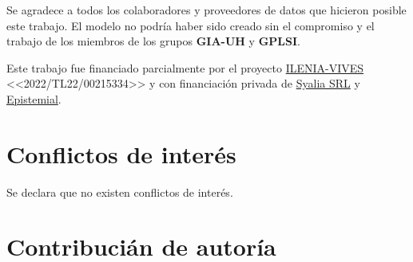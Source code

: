 \documentclass[10pt,twoside]{rcmart} %
\begin{document}
	Se agradece a todos los colaboradores y proveedores de datos que hicieron posible este trabajo. El modelo no podría haber sido creado sin el compromiso y el trabajo de los miembros de los grupos \textbf{GIA-UH} y \textbf{GPLSI}.

	Este trabajo fue financiado parcialmente por el proyecto \href{https://vives.gplsi.es/}{ILENIA-VIVES} <<2022/TL22/00215334>> y con financiación privada de \href{https://syalia.com/en/}{Syalia SRL} y \href{https://epistemial.com/}{Epistemial}.

\section*{Conflictos de interés}

	Se declara que no existen conflictos de interés.

\section*{Contribucián de autoría}
\end{document}
